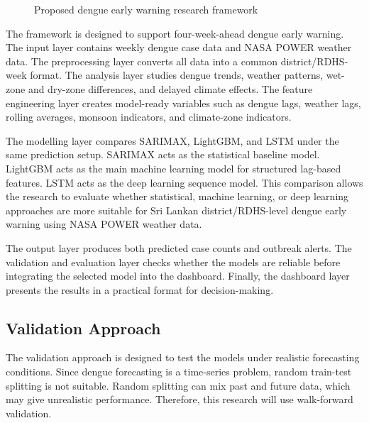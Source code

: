 \documentclass[12pt,a4paper]{article}
\begin{document}
\begin{figure}[htbp]
{
}
\caption{Proposed dengue early warning research framework}
\label{fig:research_framework}
\end{figure}

The framework is designed to support four-week-ahead dengue early warning. The input layer contains weekly dengue case data and NASA POWER weather data. The preprocessing layer converts all data into a common district/RDHS-week format. The analysis layer studies dengue trends, weather patterns, wet-zone and dry-zone differences, and delayed climate effects. The feature engineering layer creates model-ready variables such as dengue lags, weather lags, rolling averages, monsoon indicators, and climate-zone indicators.

The modelling layer compares SARIMAX, LightGBM, and LSTM under the same prediction setup. SARIMAX acts as the statistical baseline model. LightGBM acts as the main machine learning model for structured lag-based features. LSTM acts as the deep learning sequence model. This comparison allows the research to evaluate whether statistical, machine learning, or deep learning approaches are more suitable for Sri Lankan district/RDHS-level dengue early warning using NASA POWER weather data.

The output layer produces both predicted case counts and outbreak alerts. The validation and evaluation layer checks whether the models are reliable before integrating the selected model into the dashboard. Finally, the dashboard layer presents the results in a practical format for decision-making.

\subsection{Validation Approach}

The validation approach is designed to test the models under realistic forecasting conditions. Since dengue forecasting is a time-series problem, random train-test splitting is not suitable. Random splitting can mix past and future data, which may give unrealistic performance. Therefore, this research will use walk-forward validation.
\end{document}
